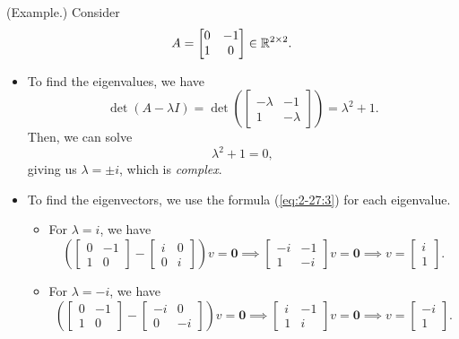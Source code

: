 \documentclass[letterpaper]{article}
\newcommand{\0}{\mathbf{0}}
\begin{document}
\begin{mdframed}
    (Example.) Consider \[A = \begin{bmatrix}
        0 & -1 \\ 1 & 0
    \end{bmatrix} \in \mathbb{R}^{2 \times 2}.\] 
    \begin{itemize}
        \item To find the eigenvalues, we have 
        \[\det(A - \lambda I) = \det\left(\begin{bmatrix}
            -\lambda & -1 \\ 1 & -\lambda
        \end{bmatrix}\right) = \lambda^2 + 1.\]
        Then, we can solve \[\lambda^2 + 1 = 0,\] giving us $\lambda = \pm i$, which is \emph{complex}.  

        \item To find the eigenvectors, we use the formula (\ref{eq:2-27:3}) for each eigenvalue.
        \begin{itemize}
            \item For $\lambda = i$, we have 
            \[\left(\begin{bmatrix}
                0 & - 1 \\ 1 & 0 
            \end{bmatrix} - \begin{bmatrix}
                i & 0 \\ 
                0 & i
            \end{bmatrix}\right)v = \0 \implies \begin{bmatrix}
                -i & -1 \\ 
                1 & -i
            \end{bmatrix}v = \0 \implies v = \begin{bmatrix}
                i \\ 1
            \end{bmatrix}.\]
            
            \item For $\lambda = -i$, we have 
            \[\left(\begin{bmatrix}
                0 & -1 \\ 1 & 0
            \end{bmatrix} - \begin{bmatrix}
                -i & 0 \\ 
                0 & -i
            \end{bmatrix}\right)v = \0 \implies \begin{bmatrix}
                i & -1 \\ 1 & i
            \end{bmatrix}v = \0 \implies v = \begin{bmatrix}
                -i \\ 1
            \end{bmatrix}.\]
        \end{itemize}
    \end{itemize}
\end{mdframed}
\end{document}
